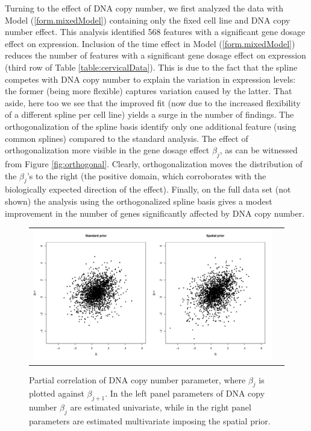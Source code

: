 Turning to the effect of DNA copy number, we first analyzed the data with Model (\ref{form.mixedModel}) containing only the fixed cell line and DNA copy number effect. This analysis identified 568 features with a significant gene dosage effect on expression. Inclusion of the time effect in Model (\ref{form.mixedModel}) reduces the number of features with a significant gene dosage effect on expression (third row of Table \ref{table:cervicalData}). This is due to the fact that the spline competes with DNA copy number to explain the variation in expression levels: the former (being more flexible) captures variation caused by the latter. That aside, here too we see that the improved fit (now due to the increased flexibility of a different spline per cell line) yields a surge in the number of findings. The orthogonalization of the spline basis identify only one additional feature (using common splines) compared to the standard analysis. The effect of orthogonalization more visible in the gene dosage effect $\beta_j$, as can be witnessed from  Figure \ref{fig:orthogonal}. Clearly, orthogonalization moves the distribution of the $\beta_j$'s to the right (the positive domain, which corroborates with the biologically expected direction of the effect). Finally, on the full data set (not shown) the analysis using the orthogonalized spline basis gives a modest improvement in the number of genes significantly affected by DNA copy number.

\begin{figure}[h!]
\centering
\begin{tabular}{cc}
\includegraphics[scale=0.4]{Figure3.pdf}
\end{tabular}
\caption{Partial correlation of DNA copy number parameter, where $\beta_j$ is 
 plotted against $\beta_{j+1}$. In the left panel parameters of DNA copy number $\beta_j$ are 
 estimated univariate, while in the right panel parameters are estimated 
 multivariate imposing the spatial prior.}
\label{fig:partial}
\end{figure}

